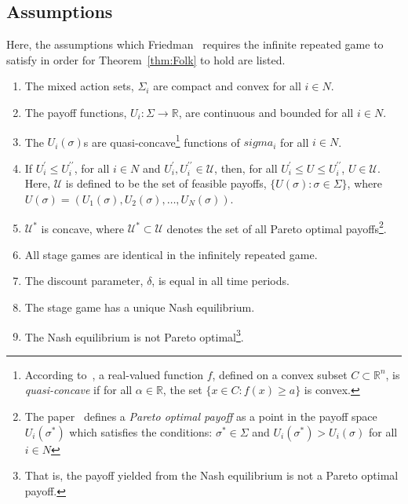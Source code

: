 \subsection{Assumptions}\label{subsec:Assumptions}
Here, the assumptions which Friedman~\cite{friedman1971non} requires the
infinite repeated game to satisfy in order for Theorem~\ref{thm:Folk} to hold are listed.
\begin{enumerate}
    \item The mixed action sets, \(\Sigma_{i}\) are compact and convex for all
    \(i\in N\). 

    \item The payoff functions, \(U_{i}: \Sigma \to \mathbb{R}\), are continuous
    and bounded for all \(i\in N\).

    \item The \(U_{i}(\sigma)\)s are quasi-concave\footnote{According
    to~\cite{Stover}, a real-valued function \(f\), defined on a convex subset
    \(C \subset \mathbb{R}^n\), is \textit{quasi-concave} if for all \(\alpha
    \in \mathbb{R}\), the set \( \{ x \in C : f(x) \ge a \} \) is convex.}
    functions of \(sigma_{i}\) for all \(i\in N\).

    \item If  \(U_{i}^{\prime} \le U_{i}^{\prime\prime}\), for all \(i\in N\)
    and \(U_{i}^{\prime}, U_{i}^{\prime\prime} \in \mathcal{U}\), then, for all
    \(U_{i}^{\prime} \le U \le U_{i}^{\prime\prime}\), \(U \in \mathcal{U}\). Here, \(\mathcal{U}\)
    is defined to be the set of feasible payoffs, \( \{ U(\sigma) : \sigma \in
    \Sigma \} \), where \(U(\sigma) = (U_{1}(\sigma), U_{2}(\sigma), \ldots,
    U_{N}(\sigma))\).

    \item \(\mathcal{U}^{*}\) is concave, where \(\mathcal{U}^{*} \subset \mathcal{U}\) denotes the
    set of all Pareto optimal payoffs\footnote{The paper~\cite{friedman1971non} defines a
    \textit{Pareto optimal payoff} as a point in the payoff space
    \(U_{i}(\sigma^{*})\) which satisfies the conditions: \(\sigma^{*} \in
    \Sigma \) and \(U_{i}(\sigma^{*}) > U_{i}(\sigma)\) for all \(i \in N\)}.

    \item All stage games are identical in the infinitely repeated game.

    \item The discount parameter, \(\delta \), is equal in all time periods.
    
    \item The stage game has a unique Nash equilibrium.

    \item The Nash equilibrium is not Pareto optimal\footnote{That is, the
    payoff yielded from the Nash equilibrium is not a Pareto optimal payoff.}. 
\end{enumerate}

